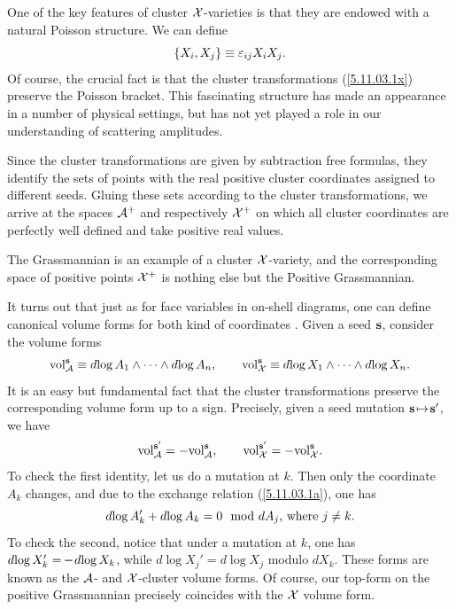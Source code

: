 \documentclass[12pt,hyperref,compress]{JHEP3}
\newcommand{\eq}[1]{\begin{equation}#1\end{equation}}
\newcommand{\mi}{{\rm\rule[2.4pt]{6pt}{0.65pt}}}
\begin{document}
One of the key features of cluster ${\cal X}$-varieties is that they are endowed with a natural Poisson structure. We can define
\vspace{-.2cm}\eq{\{X_i, X_j\}\equiv \varepsilon_{ij}X_iX_j.\vspace{-.2cm}}
Of course, the crucial fact is that the cluster transformations (\ref{5.11.03.1x}) preserve the Poisson bracket. This fascinating structure has made an appearance in a number of physical settings, but has not yet  played a role in our understanding of scattering amplitudes.

Since the cluster transformations are given by subtraction free formulas,
they identify the sets of points with the real positive cluster coordinates
assigned to different seeds. Gluing these sets according to the
cluster transformations,
we arrive at the spaces ${\cal A}^+$ and respectively ${\cal X}^+$ on
which all cluster coordinates are perfectly well defined and take
positive real values.

The Grassmannian is an example of a cluster ${\cal X}$-variety, and
the corresponding space of positive points  ${\cal X}^+$ is nothing
else but the Positive Grassmannian.


It turns out that just as for face variables in on-shell diagrams, one can define canonical volume forms for both kind of coordinates \cite{FG4}. Given a seed ${\bf s}$, consider the volume forms
\vspace{-.2cm}\eq{{\rm vol}^{\bf s}_{\cal A}\equiv d\!\log A_1 \wedge \cdots \wedge d\!\log A_n,\qquad{\rm vol}^{\bf s}_{\cal X}\equiv d\!\log X_1 \wedge \cdots \wedge d\!\log X_n.\vspace{-.2cm}}
It is an easy but fundamental fact that the cluster transformations preserve the corresponding volume form up to a sign. Precisely, given a seed mutation ${\bf s}\!\mapsto\!{\bf s}'$, we have
\vspace{-.2cm}\eq{{\rm vol}^{\bf s'}_{\cal A} = -{\rm vol}^{\bf s}_{\cal A}, \qquad {\rm vol}^{\bf s'}_{\cal X} = - {\rm vol}^{\bf s}_{\cal X}.\vspace{-.2cm}}
To check the first identity, let us do a mutation at $k$. Then only the coordinate $A_k$ changes, and due to the exchange relation (\ref{5.11.03.1a}), one has
\vspace{-.2cm}\eq{d\!\log A'_k + d\!\log A_k =0 ~~\mbox{mod $dA_j$, where $j \not = k$}. \vspace{-.2cm}}
To check the second, notice that under a mutation at $k$, one has $d\!\log X_k'=\mi\, d\!\log X_k$, while $d\!\log X_j' = d\!\log X_j$ modulo $dX_k$. These forms are known as the ${\cal A}$- and ${\cal X}$-cluster volume forms. Of course, our top-form on the positive Grassmannian precisely coincides with the ${\cal X}$ volume form.\\[-7pt]
\end{document}

